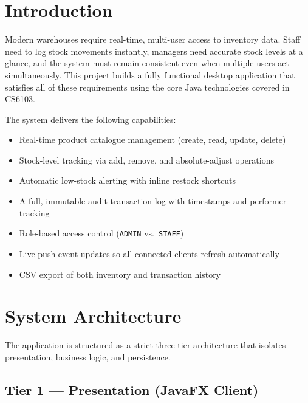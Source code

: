 \documentclass[12pt,a4paper]{article}
\begin{document}
\section{Introduction}

Modern warehouses require real-time, multi-user access to inventory data. Staff need to
log stock movements instantly, managers need accurate stock levels at a glance, and the
system must remain consistent even when multiple users act simultaneously. This project
builds a fully functional desktop application that satisfies all of these requirements
using the core Java technologies covered in CS6103.

The system delivers the following capabilities:

\begin{itemize}[leftmargin=1.4em]
  \item Real-time product catalogue management (create, read, update, delete)
  \item Stock-level tracking via add, remove, and absolute-adjust operations
  \item Automatic low-stock alerting with inline restock shortcuts
  \item A full, immutable audit transaction log with timestamps and performer tracking
  \item Role-based access control (\texttt{ADMIN} vs.\ \texttt{STAFF})
  \item Live push-event updates so all connected clients refresh automatically
  \item CSV export of both inventory and transaction history
\end{itemize}

\section{System Architecture}

The application is structured as a strict three-tier architecture that isolates
presentation, business logic, and persistence.

\subsection{Tier 1 --- Presentation (JavaFX Client)}
\end{document}
